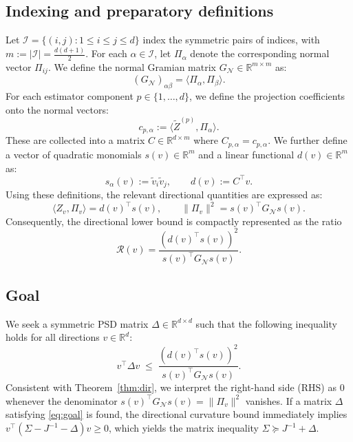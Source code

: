 \documentclass[pdflatex,sn-mathphys-num]{sn-jnl}%
\newcommand{\ip}[2]{\langle #1,#2\rangle}
\theoremstyle{thmstyleone}%
\theoremstyle{thmstyletwo}%
\theoremstyle{thmstylethree}%
\begin{document}
\subsection*{Indexing and preparatory definitions}
Let $\mathcal I = \{(i,j) : 1 \le i \le j \le d\}$ index the symmetric pairs of indices, with $m := |\mathcal I| = \frac{d(d+1)}{2}$. For each $\alpha \in \mathcal I$, let $\Pi_\alpha$ denote the corresponding normal vector $\Pi_{ij}$. We define the normal Gramian matrix \(G_{\mathcal{N}} \in \mathbb{R}^{m\times m}\) as:
\[
(G_{\mathcal{N}})_{\alpha\beta} = \ip{\Pi_\alpha}{\Pi_\beta}.
\]
For each estimator component $p \in \{1, \dots, d\}$, we define the projection coefficients onto the normal vectors:
\[
c_{p,\alpha} := \ip{\widetilde Z^{(p)}}{\Pi_\alpha}.
\]
These are collected into a matrix $C \in \mathbb{R}^{d\times m}$ where $C_{p,\alpha} = c_{p,\alpha}$. We further define a vector of quadratic monomials $s(v) \in \mathbb{R}^{m}$ and a linear functional $d(v) \in \mathbb{R}^m$ as:
\[
s_\alpha(v) := \widetilde v_i \widetilde v_j, \qquad d(v) := C^\top v.
\]
Using these definitions, the relevant directional quantities are expressed as:
\[
\langle Z_v,\Pi_v\rangle = d(v)^\top s(v), \qquad \|\Pi_v\|^2 = s(v)^\top G_{\mathcal{N}} s(v).
\]
Consequently, the directional lower bound is compactly represented as the ratio
\[
\mathcal R(v) = \frac{(d(v)^\top s(v))^2}{s(v)^\top G_{\mathcal{N}} s(v)}.
\]

\subsection*{Goal} 
We seek a symmetric PSD matrix $\Delta \in \mathbb{R}^{d\times d}$ such that the following inequality holds for all directions $v \in \mathbb{R}^d$:
\begin{equation}\label{eq:goal}
v^\top\Delta v \;\le\; \frac{(d(v)^\top s(v))^2}{s(v)^\top G_{\mathcal{N}} s(v)}.
\end{equation}
Consistent with Theorem~\ref{thm:dir}, we interpret the right-hand side (RHS) as $0$ whenever the denominator $s(v)^\top G_{\mathcal{N}} s(v) = \|\Pi_v\|^2$ vanishes. If a matrix $\Delta$ satisfying \eqref{eq:goal} is found, the directional curvature bound immediately implies $v^\top(\Sigma - J^{-1} - \Delta)v \ge 0$, which yields the matrix inequality $\Sigma \succeq J^{-1} + \Delta$.
\end{document}
